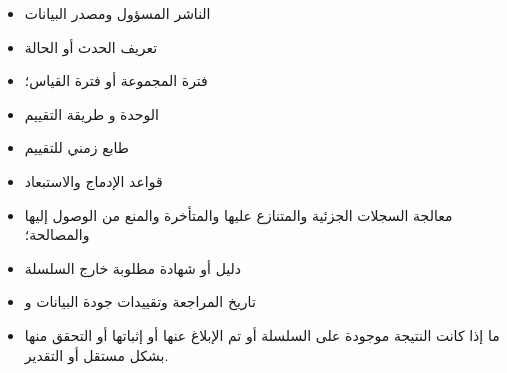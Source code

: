 \documentclass[11pt]{article}
\begin{document}
\begin{itemize}[leftmargin=*]
\item الناشر المسؤول ومصدر البيانات
\item تعريف الحدث أو الحالة
\item فترة المجموعة أو فترة القياس؛
\item الوحدة و طريقة التقييم
\item طابع زمني للتقييم
\item قواعد الإدماج والاستبعاد
\item معالجة السجلات الجزئية والمتنازع عليها والمتأخرة والمنع من الوصول إليها والمصالحة؛
\item دليل أو شهادة مطلوبة خارج السلسلة
\item تاريخ المراجعة وتقييدات جودة البيانات و
\item ما إذا كانت النتيجة موجودة على السلسلة أو تم الإبلاغ عنها أو إثباتها أو التحقق منها بشكل مستقل أو التقدير.
\end{itemize}
\end{document}
